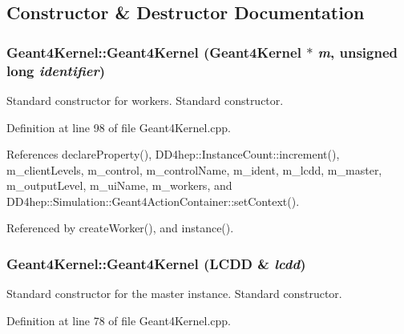 \subsection{Constructor \& Destructor Documentation}
\hypertarget{class_d_d4hep_1_1_simulation_1_1_geant4_kernel_ad73b43c4abdbae6586b77ffdb06492d1}{
\subsubsection[{Geant4Kernel}]{\setlength{\rightskip}{0pt plus 5cm}Geant4Kernel::Geant4Kernel ({\bf Geant4Kernel} $\ast$ {\em m}, \/  unsigned long {\em identifier})}}
\label{class_d_d4hep_1_1_simulation_1_1_geant4_kernel_ad73b43c4abdbae6586b77ffdb06492d1}


Standard constructor for workers. Standard constructor. 

Definition at line 98 of file Geant4Kernel.cpp.

References declareProperty(), DD4hep::InstanceCount::increment(), m\_\-clientLevels, m\_\-control, m\_\-controlName, m\_\-ident, m\_\-lcdd, m\_\-master, m\_\-outputLevel, m\_\-uiName, m\_\-workers, and DD4hep::Simulation::Geant4ActionContainer::setContext().

Referenced by createWorker(), and instance().\hypertarget{class_d_d4hep_1_1_simulation_1_1_geant4_kernel_afa28c3122a6607f3641d22f1c1602786}{
\subsubsection[{Geant4Kernel}]{\setlength{\rightskip}{0pt plus 5cm}Geant4Kernel::Geant4Kernel ({\bf LCDD} \& {\em lcdd})}}
\label{class_d_d4hep_1_1_simulation_1_1_geant4_kernel_afa28c3122a6607f3641d22f1c1602786}


Standard constructor for the master instance. Standard constructor. 

Definition at line 78 of file Geant4Kernel.cpp.

